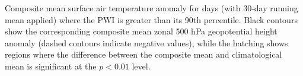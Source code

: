 \label{fig:tas_composite}
Composite mean surface air temperature anomaly for days (with 30-day running mean applied) where the PWI is greater than its 90th percentile. Black contours show the corresponding composite mean zonal 500 hPa geopotential height anomaly (dashed contours indicate negative values), while the hatching shows regions where the difference between the composite mean and climatological mean is significant at the $p < 0.01$ level.  

